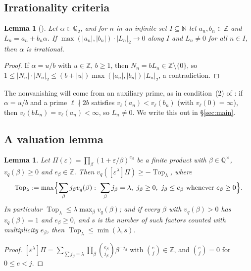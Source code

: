 \documentclass{amsart}
\newtheorem{lemma}[theorem]{Lemma}
\theoremstyle{definition}
\theoremstyle{remark}
\numberwithin{equation}{section}
\newcommand{\Z}{\mathbb{Z}}
\newcommand{\Q}{\mathbb{Q}}
\newcommand{\N}{\mathbb{N}}
\newcommand{\Top}{\operatorname{Top}}
\begin{document}
\subsection{Irrationality criteria}\label{ss:criteria}

\begin{lemma}[{\cite[Lemma~2.1]{Lai25}}]\label{lem:lai}
Let $\alpha\in\Q_2$, and for $n$ in an infinite set $I\subseteq\N$ let
$a_n,b_n\in\Z$ and $L_n=a_n+b_n\alpha$. If
$\max(|a_n|,|b_n|)\cdot|L_n|_2\to0$ along $I$ and $L_n\ne0$ for all $n\in I$,
then $\alpha$ is irrational.
\end{lemma}

\begin{proof}
If $\alpha=u/b$ with $u\in\Z$, $b\ge1$, then $N_n=bL_n\in\Z\setminus\{0\}$,
so $1\le|N_n|\cdot|N_n|_2\le(b+|u|)\max(|a_n|,|b_n|)\,|L_n|_2$, a contradiction.
\end{proof}

The nonvanishing will come from an auxiliary prime, as in condition~(2) of
\cite[Lemma~2.2]{LS25}: if $\alpha=u/b$ and a prime $\ell\nmid 2b$ satisfies
$v_\ell(a_n)<v_\ell(b_n)$ (with $v_\ell(0)=\infty$), then
$v_\ell(bL_n)=v_\ell(a_n)<\infty$, so $L_n\ne0$. We write this out in
\S\ref{sec:main}.

\subsection{A valuation lemma}\label{ss:D2}

\begin{lemma}\label{lem:top}
Let $\Pi(\varepsilon)=\prod_\beta(1+\varepsilon/\beta)^{e_\beta}$ be a finite
product with $\beta\in\Q^\times$, $v_q(\beta)\ge0$ and $e_\beta\in\Z$. Then
$v_q([\varepsilon^\lambda]\Pi)\ge-\Top_\lambda$, where
\[
  \Top_\lambda:=\max\Bigl\{\sum_\beta j_\beta v_q(\beta):\ \sum_\beta j_\beta=\lambda,\
  j_\beta\ge0,\ j_\beta\le e_\beta\text{ whenever }e_\beta\ge0\Bigr\}.
\]
In particular $\Top_\lambda\le\lambda\max_\beta v_q(\beta)$; and if every
$\beta$ with $v_q(\beta)>0$ has $v_q(\beta)=1$ and $e_\beta\ge0$, and $s$ is
the number of such factors counted with multiplicity $e_\beta$, then
$\Top_\lambda\le\min(\lambda,s)$.
\end{lemma}

\begin{proof}
$[\varepsilon^\lambda]\Pi=\sum_{\sum j_\beta=\lambda}\prod_\beta\binom{e_\beta}{j_\beta}\beta^{-j_\beta}$
with $\binom{e}{j}\in\Z$, and $\binom ej=0$ for $0\le e<j$.
\end{proof}
\end{document}
